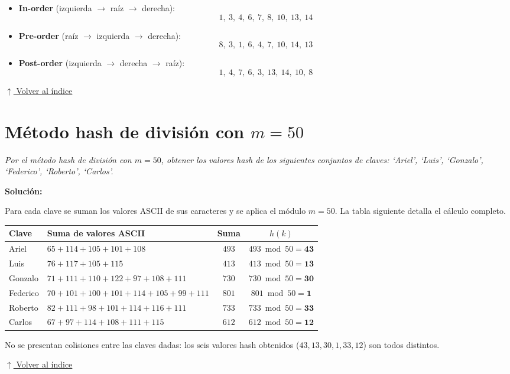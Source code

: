 \documentclass[12pt]{article}
\newcommand{\solucion}{%
    \vspace{0.8em}\textbf{Solución:}\par\vspace{0.4em}%
}
\newcommand{\volverindice}{%
    \vspace{1em}%
    \begin{flushright}%
        \hyperlink{indice}{\small $\uparrow$ Volver al índice}%
    \end{flushright}%
}
\begin{document}
\begin{itemize}[leftmargin=2cm]
    \item \textbf{In-order} (izquierda $\to$ raíz $\to$ derecha):
    \[
        1,\ 3,\ 4,\ 6,\ 7,\ 8,\ 10,\ 13,\ 14
    \]

    \item \textbf{Pre-order} (raíz $\to$ izquierda $\to$ derecha):
    \[
        8,\ 3,\ 1,\ 6,\ 4,\ 7,\ 10,\ 14,\ 13
    \]

    \item \textbf{Post-order} (izquierda $\to$ derecha $\to$ raíz):
    \[
        1,\ 4,\ 7,\ 6,\ 3,\ 13,\ 14,\ 10,\ 8
    \]
\end{itemize}

\volverindice

\newpage
\section{Método hash de división con $m = 50$}

\textit{Por el método hash de división con $m=50$, obtener los valores hash de los
siguientes conjuntos de claves: `Ariel', `Luis', `Gonzalo', `Federico', `Roberto', `Carlos'.}

\solucion

Para cada clave se suman los valores ASCII de sus caracteres y se aplica
el módulo $m = 50$. La tabla siguiente detalla el cálculo completo.

\begin{center}
\begin{tabular}{llcc}
\toprule
\textbf{Clave} & \textbf{Suma de valores ASCII} & \textbf{Suma} & $h(k)$ \\
\midrule
Ariel    & $65+114+105+101+108$ & $493$ & $493 \bmod 50 = \mathbf{43}$ \\
Luis     & $76+117+105+115$     & $413$ & $413 \bmod 50 = \mathbf{13}$ \\
Gonzalo  & $71+111+110+122+97+108+111$ & $730$ & $730 \bmod 50 = \mathbf{30}$ \\
Federico & $70+101+100+101+114+105+99+111$ & $801$ & $801 \bmod 50 = \mathbf{1}$  \\
Roberto  & $82+111+98+101+114+116+111$ & $733$ & $733 \bmod 50 = \mathbf{33}$ \\
Carlos   & $67+97+114+108+111+115$ & $612$ & $612 \bmod 50 = \mathbf{12}$ \\
\bottomrule
\end{tabular}
\end{center}

\vspace{0.5em}
No se presentan colisiones entre las claves dadas: los seis valores hash
obtenidos ($43, 13, 30, 1, 33, 12$) son todos distintos.

\volverindice
\end{document}
